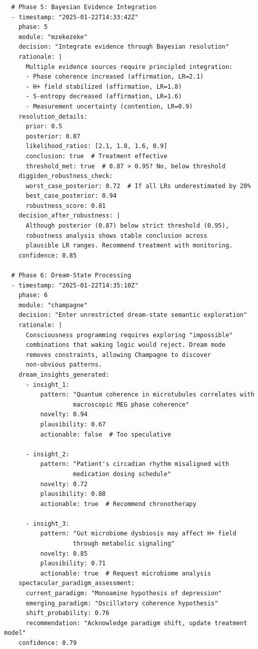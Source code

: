 \begin{verbatim}
  # Phase 5: Bayesian Evidence Integration
  - timestamp: "2025-01-22T14:33:42Z"
    phase: 5
    module: "mzekezeke"
    decision: "Integrate evidence through Bayesian resolution"
    rationale: |
      Multiple evidence sources require principled integration:
      - Phase coherence increased (affirmation, LR=2.1)
      - H+ field stabilized (affirmation, LR=1.8)
      - S-entropy decreased (affirmation, LR=1.6)
      - Measurement uncertainty (contention, LR=0.9)
    resolution_details:
      prior: 0.5
      posterior: 0.87
      likelihood_ratios: [2.1, 1.8, 1.6, 0.9]
      conclusion: true  # Treatment effective
      threshold_met: true  # 0.87 > 0.95? No, below threshold
    diggiden_robustness_check:
      worst_case_posterior: 0.72  # If all LRs underestimated by 20%
      best_case_posterior: 0.94
      robustness_score: 0.81
    decision_after_robustness: |
      Although posterior (0.87) below strict threshold (0.95),
      robustness analysis shows stable conclusion across 
      plausible LR ranges. Recommend treatment with monitoring.
    confidence: 0.85
  
  # Phase 6: Dream-State Processing
  - timestamp: "2025-01-22T14:35:10Z"
    phase: 6
    module: "champagne"
    decision: "Enter unrestricted dream-state semantic exploration"
    rationale: |
      Consciousness programming requires exploring "impossible"
      combinations that waking logic would reject. Dream mode
      removes constraints, allowing Champagne to discover
      non-obvious patterns.
    dream_insights_generated:
      - insight_1:
          pattern: "Quantum coherence in microtubules correlates with 
                   macroscopic MEG phase coherence"
          novelty: 0.94
          plausibility: 0.67
          actionable: false  # Too speculative
      
      - insight_2:
          pattern: "Patient's circadian rhythm misaligned with 
                   medication dosing schedule"
          novelty: 0.72
          plausibility: 0.88
          actionable: true  # Recommend chronotherapy
      
      - insight_3:
          pattern: "Gut microbiome dysbiosis may affect H+ field 
                   through metabolic signaling"
          novelty: 0.85
          plausibility: 0.71
          actionable: true  # Request microbiome analysis
    spectacular_paradigm_assessment:
      current_paradigm: "Monoamine hypothesis of depression"
      emerging_paradigm: "Oscillatory coherence hypothesis"
      shift_probability: 0.76
      recommendation: "Acknowledge paradigm shift, update treatment model"
    confidence: 0.79
  

\end{verbatim}
